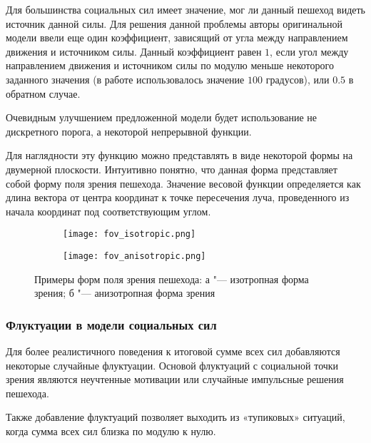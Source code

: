 Для большинства социальных сил имеет значение, мог ли данный пешеход видеть источник данной силы.
Для решения данной проблемы авторы оригинальной модели ввели еще один коэффициент, зависящий от угла между направлением движения и источником силы.
Данный коэффициент равен $1$, если угол между направлением движения и источником силы по модулю меньше некоторого заданного значения (в работе использовалось значение $100$ градусов), или $0.5$ в обратном случае.

Очевидным улучшением предложенной модели будет использование не дискретного порога, а некоторой непрерывной функции.

Для наглядности эту функцию можно представлять в виде некоторой формы на двумерной плоскости.
Интуитивно понятно, что данная форма представляет собой форму поля зрения пешехода.
Значение весовой функции определяется как длина вектора от центра координат к точке пересечения луча, проведенного из начала координат под соответствующим углом.

\begin{figure}[ht]
\centering
  \begin{subfigure}[b]{0.45\textwidth}
    \centering
    \texttt{[image: fov\_isotropic.png]}
    \caption{}
  \end{subfigure}
  \begin{subfigure}[b]{0.45\textwidth}
    \centering
    \texttt{[image: fov\_anisotropic.png]}
    \caption{}
  \end{subfigure}
  \caption{ Примеры форм поля зрения пешехода: а "--- изотропная форма зрения;
            б "--- анизотропная форма зрения}
  \label{sec:model:sf:fov:example_figure}
\end{figure}

\subsubsection{Флуктуации в модели социальных сил}
\label{sec:model:sf:fluctuation}

Для более реалистичного поведения к итоговой сумме всех сил добавляются некоторые случайные флуктуации.
Основой флуктуаций с социальной точки зрения являются неучтенные мотивации или случайные импульсные решения пешехода.

Также добавление флуктуаций позволяет выходить из «тупиковых» ситуаций, когда сумма всех сил близка по модулю к нулю.

